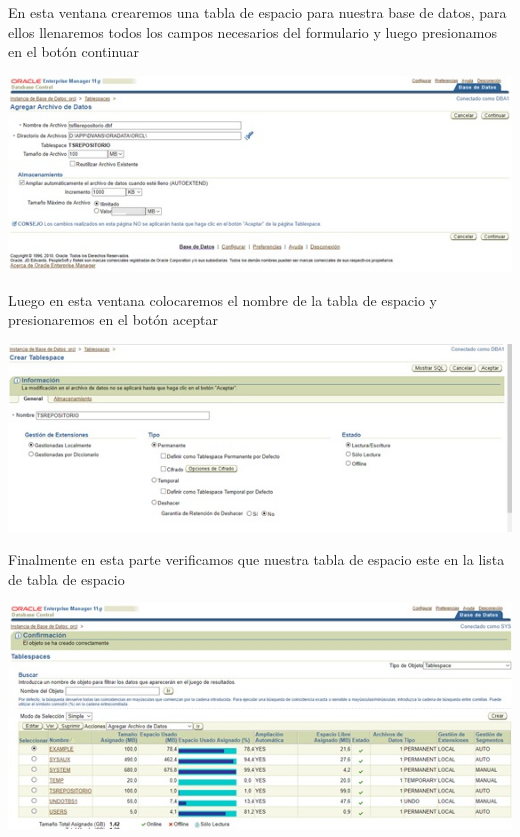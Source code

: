 \begin{flushleft}
\begin{center}
\end{center}
En esta ventana crearemos una tabla de espacio para nuestra base de datos, para ellos llenaremos todos los campos necesarios del formulario y luego presionamos en el botón continuar\\
\begin{center}
\includegraphics{images/image-31}\\
\end{center}
Luego en esta ventana colocaremos el nombre de la tabla de espacio y presionaremos en el botón aceptar\\
\begin{center}
\includegraphics{images/image-32}\\
\end{center}
Finalmente en esta parte verificamos que nuestra tabla de espacio este en la lista de tabla de espacio\\
\begin{center}
\includegraphics{images/image-33}\\

\end{center}
\end{flushleft}
